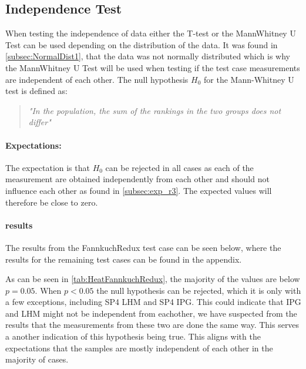 

\subsection{Independence Test}\label{subsec:independence1}

When testing the independence of data either the T-test or the MannWhitney U Test can be used depending on the distribution of the data. It was found in \cref{subsec:NormalDist1}, that the data was not normally distributed which is why the MannWhitney U Test will be used when testing if the test case measurements are independent of each other. The null hypothesis $H_0$ for the Mann-Whitney U test is defined as:

\begin{quote}
    \textit{"In the population, the sum of the rankings in the two groups does not differ"}\cite*[]{mann1947test}
\end{quote}

\paragraph{Expectations:} The expectation is that $H_0$ can be rejected in all cases as each of the measurement are obtained independently from each other and should not influence each other as found in \cref{subsec:exp_r3}. The expected values will therefore be close to zero.

\paragraph{results}
The results from the FannkuchRedux test case can be seen below, where the results for the remaining test cases can be found in the appendix.

 

As can be seen in \cref{tab:HeatFannkuchRedux}, the majority of the values are below $p = 0.05$. When $p < 0.05$ the null hypothesis can be rejected, which it is only with a few exceptions, including SP4 LHM and SP4 IPG. This could indicate that IPG and LHM might not be independent from eachother, we have suspected from the results that the measurements from these two are done the same way. This serves a another indication of this hypothesis being true.
This aligns with the expectations that the samples are mostly independent of each other in the majority of cases.

